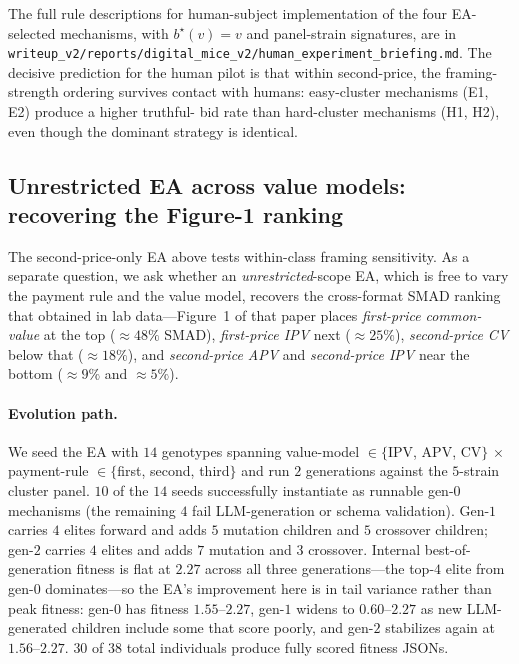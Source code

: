 \documentclass[12pt]{article}
\begin{document}
The full rule descriptions for human-subject implementation
of the four EA-selected mechanisms, with $b^\star(v) = v$ and
panel-strain signatures, are in
\texttt{writeup\_v2/reports/digital\_mice\_v2/human\_experiment\_briefing.md}.
The decisive prediction for the human pilot is that within
second-price, the framing-strength ordering survives contact with
humans: easy-cluster mechanisms (E1, E2) produce a higher truthful-
bid rate than hard-cluster mechanisms (H1, H2), even though the
dominant strategy is identical.

\subsection{Unrestricted EA across value models: recovering
the Figure-1 ranking}
\label{sec:figure1-recovery}

The second-price-only EA above tests within-class framing
sensitivity. As a separate question, we ask whether an
\emph{unrestricted}-scope EA, which is free to vary the payment
rule and the value model, recovers the cross-format SMAD ranking
that \citet{zhuLLMAuction2024} obtained in lab data---Figure~1 of
that paper places \emph{first-price common-value} at the top
($\approx 48\%$ SMAD), \emph{first-price IPV} next
($\approx 25\%$), \emph{second-price CV} below that
($\approx 18\%$), and \emph{second-price APV} and
\emph{second-price IPV} near the bottom ($\approx 9\%$ and
$\approx 5\%$).

\paragraph{Evolution path.} We seed the EA with $14$ genotypes
spanning value-model $\in\{$IPV, APV, CV$\}\,\times\,$payment-rule
$\in\{$first, second, third$\}$ and run $2$ generations against the
$5$-strain cluster panel. $10$ of the $14$ seeds successfully
instantiate as runnable gen-$0$ mechanisms (the remaining $4$ fail
LLM-generation or schema validation). Gen-$1$ carries $4$ elites
forward and adds $5$ mutation children and $5$ crossover children;
gen-$2$ carries $4$ elites and adds $7$ mutation and $3$ crossover.
Internal best-of-generation fitness is flat at $2.27$ across all
three generations---the top-$4$ elite from gen-$0$ dominates---so
the EA's improvement here is in tail variance rather than peak
fitness: gen-$0$ has fitness $1.55$--$2.27$, gen-$1$ widens to
$0.60$--$2.27$ as new LLM-generated children include some that
score poorly, and gen-$2$ stabilizes again at $1.56$--$2.27$. $30$
of $38$ total individuals produce fully scored fitness JSONs.
\end{document}
